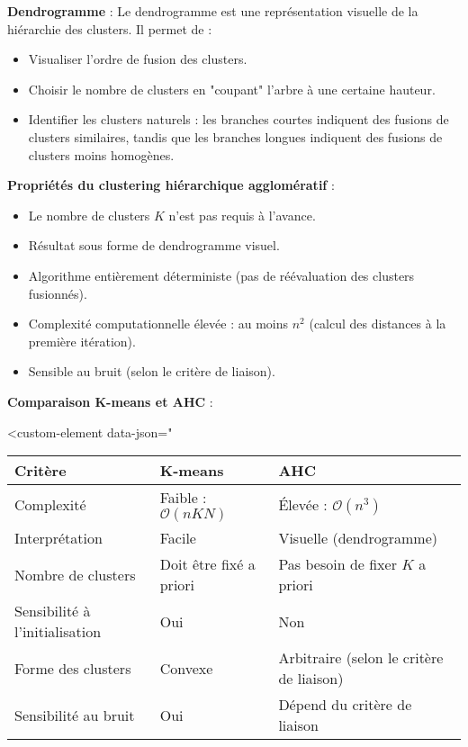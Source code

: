 \documentclass[10pt,a4paper]{article}
\begin{document}
\textbf{Dendrogramme} :
Le dendrogramme est une représentation visuelle de la hiérarchie des clusters. Il permet de :
\begin{itemize}
    \item Visualiser l'ordre de fusion des clusters.
    \item Choisir le nombre de clusters en "coupant" l'arbre à une certaine hauteur.
    \item Identifier les clusters naturels : les branches courtes indiquent des fusions de clusters similaires, tandis que les branches longues indiquent des fusions de clusters moins homogènes.
\end{itemize}

\textbf{Propriétés du clustering hiérarchique agglomératif} :
\begin{itemize}
    \item Le nombre de clusters $K$ n'est pas requis à l'avance.
    \item Résultat sous forme de dendrogramme visuel.
    \item Algorithme entièrement déterministe (pas de réévaluation des clusters fusionnés).
    \item Complexité computationnelle élevée : au moins $n^2$ (calcul des distances à la première itération).
    \item Sensible au bruit (selon le critère de liaison).
\end{itemize}

\textbf{Comparaison K-means et AHC} :
\begin{table}[h]
\centering
<custom-element data-json="%
\begin{tabular}{|l|l|l|}
\hline
\textbf{Critère} & \textbf{K-means} & \textbf{AHC} \\ \hline
Complexité & Faible : $\mathcal{O}(n K N)$ & Élevée : $\mathcal{O}(n^3)$ \\ \hline
Interprétation & Facile & Visuelle (dendrogramme) \\ \hline
Nombre de clusters & Doit être fixé a priori & Pas besoin de fixer $K$ a priori \\ \hline
Sensibilité à l'initialisation & Oui & Non \\ \hline
Forme des clusters & Convexe & Arbitraire (selon le critère de liaison) \\ \hline
Sensibilité au bruit & Oui & Dépend du critère de liaison \\ \hline
\end{tabular}
\end{table}
\end{document}
